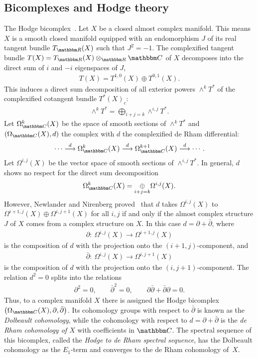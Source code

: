 \documentclass[pdftex]{sigma}
\theoremstyle{definition}
\numberwithin{equation}{section}
\def\C{{\mathbbm C}}
\def\R{{\mathbbm R}}
\def\lra{{\longrightarrow}}
\newcommand{\oplusop}[1]{{\mathop{\oplus}\limits_{#1}}}
\begin{document}
\subsection{Bicomplexes and Hodge theory}
The Hodge bicomplex~\cite{DGMS, GH, W}.
Let $X$ be a closed almost complex manifold. This means $X$ is a smooth closed manifold equipped with an endomorphism $J$ of its real tangent bundle $T_\R(X)$ such that $J^2=-1$.
The complexified tangent bundle $T(X)=T_\R(X)\otimes_{\R}\C$ of
$X$ decomposes into the direct sum of $i$ and $-i$ eigenspaces of $J$,
\begin{gather*} T(X) = T^{1,0}(X) \oplus T^{0,1}(X).\end{gather*}
This induces a direct sum decomposition of all exterior powers $\wedge ^kT^{\ast}$
of the complexified cotangent bundle $T^{\ast}(X)_c$:
\begin{gather*} \wedge^kT^{\ast} = \bigoplus_{i+j=k} \wedge^{i,j}T^{\ast} .\end{gather*}
Let $\Omega_{\C}^k(X)$ be the space of smooth sections of $\wedge^kT^{\ast}$
and $(\Omega_{\C}(X),d)$ the complex with $d$ the complexified de Rham differential:
\begin{gather*}\cdots \stackrel{d}{\lra} \Omega_{\C}^k(X) \stackrel{d}{\lra} \Omega_{\C}^{k+1}(X)
\stackrel{d}{\lra}\cdots. \end{gather*}
Let $\Omega^{i,j}(X)$ be the vector space of smooth sections of
$\wedge^{i,j}T^{\ast}$.
In general, $d$ shows no respect for the direct sum decomposition
\begin{gather*} \Omega_{\C}^k(X) = \oplusop{i+j=k} \Omega^{i,j}(X).\end{gather*}
However, Newlander and Nirenberg proved~\cite{NN} that $d$ takes
$\Omega^{i,j}(X)$ to $\Omega^{i+1,j}(X)\oplus \Omega^{i,j+1}(X)$
for all $i,j$ if and only if the almost complex structure $J$ of $X$ comes from a
complex structure on $X$. In this case $d= \partial + \bar{\partial}$, where
\begin{gather*} \partial \colon \  \Omega^{i,j}(X) \lra \Omega^{i+1,j}(X)\end{gather*}
is the composition of $d$ with the projection onto the $(i+1,j)$-component,
and
\begin{gather*} \bar{\partial} \colon \ \Omega^{i,j}(X) \lra \Omega^{i,j+1}(X)\end{gather*}
is the composition of $d$ with the projection onto the $(i,j+1)$-component.
The relation $d^2=0$ splits into the relations
\begin{gather*} \partial^2=0, \qquad \bar{\partial}^2=0, \qquad
\partial \bar{\partial} + \bar{\partial} \partial =0.\end{gather*}
Thus, to a complex manifold $X$ there is assigned
the Hodge bicomplex $\big(\Omega_{\C}(X), \partial, \bar{\partial}\big)$.
Its cohomology groups with respect to $\bar{\partial}$ is known as
the \emph{Dolbeault cohomology}, while the cohomology with respect to
$d= \partial + \bar{\partial}$ is the \emph{de Rham cohomology of $X$}
with coefficients in $\C$. The spectral sequence of this bicomplex,
called the \emph{Hodge to de Rham spectral sequence},
has the Dolbeault cohomology as the $E_1$-term and converges to
the de Rham cohomology of~$X$.
\end{document}
